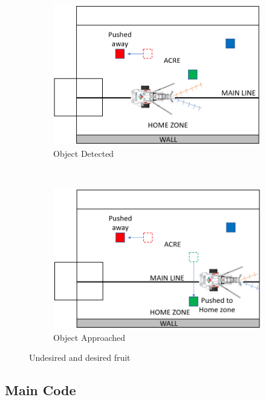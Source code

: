\begin{figure}[!ht]
	\centering
	\begin{subfigure}[b]{0.45\textwidth}
		\centering
		\includegraphics[width=\textwidth]{Graphics/objectPushed}
		\caption{Object Detected}
		\label{fig:objectPushed}
	\end{subfigure}
	~
	\begin{subfigure}[b]{0.45\textwidth}
		\centering
		\includegraphics[width=\textwidth]{Graphics/objectDelivered}
		\caption{Object Approached}
		\label{fig:objectDelivered}
	\end{subfigure}
	\caption{Undesired and desired fruit}
	\label{fig:fruitSensing}
	\vspace{-4mm}
\end{figure}


\newpage
\subsection{Main Code}\label{sec:mainCode}

